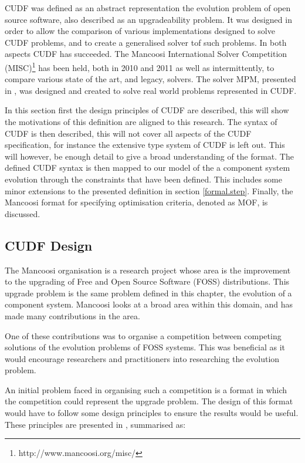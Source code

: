 CUDF was defined as an abstract representation the evolution problem of open source software, also described as an upgradeability problem.
It was designed in order to allow the comparison of various implementations designed to solve CUDF problems, 
and to create a generalised solver tof such problems.
In both aspects CUDF has succeeded.
The Mancoosi International Solver Competition (MISC)\footnote{http://www.mancoosi.org/misc/} has been held, both in 2010 and 2011 as well as intermittently, 
to compare various state of the art, and legacy, solvers.
The solver MPM, presented in \citep{abate2011}, was designed and created to solve real world problems represented in CUDF.

In this section first the design principles of CUDF are described, this will show the motivations of this definition are aligned to this research.
The syntax of CUDF is then described, this will not cover all aspects of the CUDF specification, for instance the extensive type system of CUDF is left out.
This will however, be enough detail to give a broad understanding of the format.
The defined CUDF syntax is then mapped to our model of the a component system evolution through the constraints that have been defined.
This includes some minor extensions to the presented definition in section \ref{formal.step}.
Finally, the Mancoosi format for specifying optimisation criteria, denoted as MOF, is discussed.

\subsection{CUDF Design}
The Mancoosi organisation is a research project whose area is the improvement to the upgrading of Free and Open Source Software (FOSS) distributions.
This upgrade problem is the same problem defined in this chapter, the evolution of a component system.
Mancoosi looks at a broad area within this domain, and has made many contributions in the area.

One of these contributions was to organise a competition between competing solutions of the evolution problems of FOSS systems.
This was beneficial as it would encourage researchers and practitioners into researching the evolution problem.

An initial problem faced in organising such a competition is a format in which the competition could represent the upgrade problem.
The design of this format would have to follow some design principles to ensure the results would be useful.
These principles are presented in \citep{treinen2009common}, summarised as:

